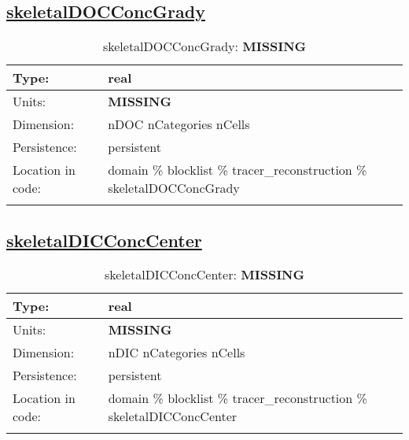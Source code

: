 \subsection[skeletalDOCConcGrady]{\hyperref[sec:var_tab_tracer_reconstruction]{skeletalDOCConcGrady}}
\label{subsec:var_sec_tracer_reconstruction_skeletalDOCConcGrady}
\begin{center}
\begin{longtable}{| p{2.0in} | p{4.0in} |}
        \hline 
        Type: & real \\
        \hline 
        Units: & {\bf \color{red} MISSING} \\
        \hline 
        Dimension: & nDOC nCategories nCells \\
        \hline 
        Persistence: & persistent \\
        \hline 
         Location in code: & domain \% blocklist \% tracer\_reconstruction \% skeletalDOCConcGrady \\
         \hline 
    \caption{skeletalDOCConcGrady: {\bf \color{red} MISSING}}
\end{longtable}
\end{center}
\subsection[skeletalDICConcCenter]{\hyperref[sec:var_tab_tracer_reconstruction]{skeletalDICConcCenter}}
\label{subsec:var_sec_tracer_reconstruction_skeletalDICConcCenter}
\begin{center}
\begin{longtable}{| p{2.0in} | p{4.0in} |}
        \hline 
        Type: & real \\
        \hline 
        Units: & {\bf \color{red} MISSING} \\
        \hline 
        Dimension: & nDIC nCategories nCells \\
        \hline 
        Persistence: & persistent \\
        \hline 
         Location in code: & domain \% blocklist \% tracer\_reconstruction \% skeletalDICConcCenter \\
         \hline 
    \caption{skeletalDICConcCenter: {\bf \color{red} MISSING}}
\end{longtable}
\end{center}
